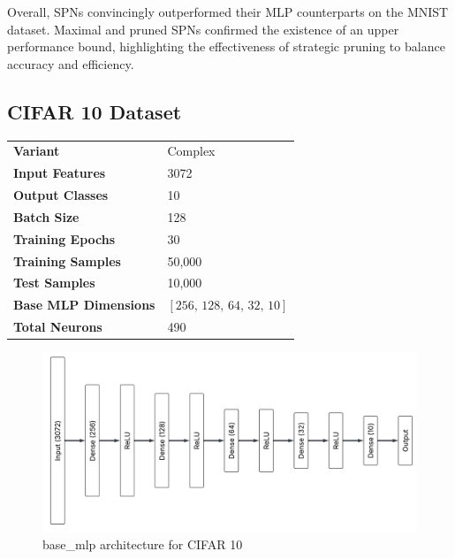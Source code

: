 Overall, SPNs convincingly outperformed their MLP counterparts on the MNIST dataset. Maximal and pruned SPNs confirmed the existence of an upper performance bound, highlighting the effectiveness of strategic pruning to balance accuracy and efficiency.

\subsection{CIFAR 10 Dataset}

\begin{tabular}{@{}ll@{}}
\textbf{Variant} & Complex \\
\textbf{Input Features} & 3072 \\
\textbf{Output Classes} & 10 \\
\textbf{Batch Size} & 128 \\
\textbf{Training Epochs} & 30 \\
\textbf{Training Samples} & 50,000 \\
\textbf{Test Samples} & 10,000 \\
\textbf{Base MLP Dimensions} & $[256,\, 128,\, 64,\, 32,\, 10]$ \\
\textbf{Total Neurons} & 490 \\
\end{tabular}

\begin{figure}[H]
    \centering
    \includegraphics[width=1.0\textwidth]{Figures/Results/CIFAR_10/CIFAR_base_mlp_architecture.png} 
    \captionsetup{justification=centering}  %
    \caption{base\_mlp architecture for CIFAR 10}
    \label{fig:cifarMlpBaseArch}
\end{figure}

